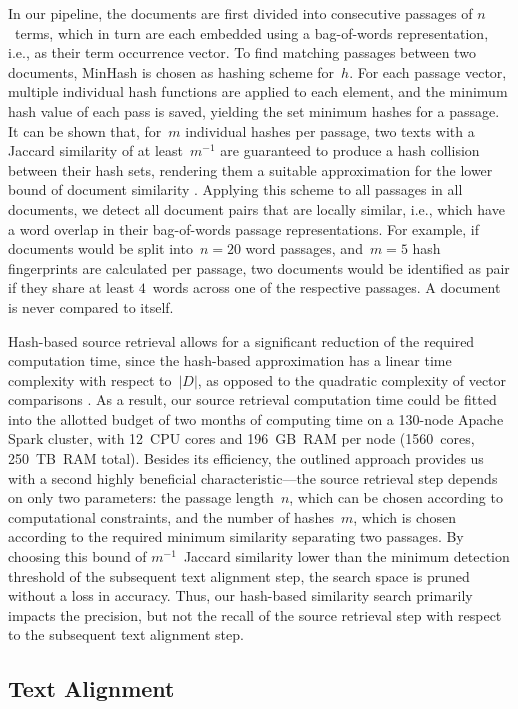 \documentclass[fleqn,10pt]{wlscirep}
\begin{document}
In our pipeline, the documents are first divided into consecutive passages of $n$~terms, which in turn are each embedded using a bag-of-words representation, i.e., as their term occurrence vector. To find matching passages between two documents, MinHash \cite{broder:97} is chosen as hashing scheme for~$h$. For each passage vector, multiple individual hash functions are applied to each element, and the minimum hash value of each pass is saved, yielding the set minimum hashes for a passage. It can be shown that, for~$m$ individual hashes per passage, two texts with a Jaccard similarity of at least~$m^{-1}$ are guaranteed to produce a hash collision between their hash sets, rendering them a suitable approximation for the lower bound of document similarity \cite{broder:97}. Applying this scheme to all passages in all documents, we detect all document pairs that are locally similar, i.e., which have a word overlap in their bag-of-words passage representations. For example, if documents would be split into~$n=20$ word passages, and~$m=5$ hash fingerprints are calculated per passage, two documents would be identified as pair if they share at least $4$~words across one of the respective passages. A document is never compared to itself.

Hash-based source retrieval allows for a significant reduction of the required computation time, since the hash-based approximation has a linear time complexity with respect to~$|D|$, as opposed to the quadratic complexity of vector comparisons \cite{stein:2019c}. As a result, our source retrieval computation time could be fitted into the allotted budget of two months of computing time on a 130-node Apache Spark cluster, with 12~CPU cores and 196~GB~RAM per node (1560~cores, 250~TB~RAM total). Besides its efficiency, the outlined approach provides us with a second highly beneficial characteristic---the source retrieval step depends on only two parameters: the passage length~$n$, which can be chosen according to computational constraints, and the number of hashes~$m$, which is chosen according to the required minimum similarity separating two passages. By choosing this bound of $m^{-1}$~Jaccard similarity lower than the minimum detection threshold of the subsequent text alignment step, the search space is pruned without a loss in accuracy. Thus, our hash-based similarity search primarily impacts the precision, but not the recall of the source retrieval step with respect to the subsequent text alignment step.


\subsection*{Text Alignment}\label{sub:alignment}
\end{document}
